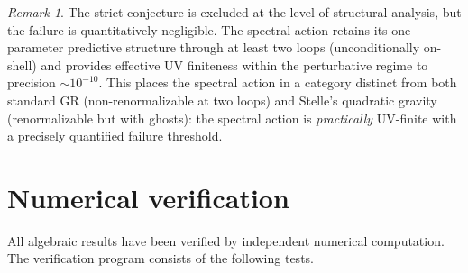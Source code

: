 \documentclass[12pt,a4paper]{article}
\theoremstyle{definition}
\theoremstyle{remark}
\newtheorem{remark}[theorem]{Remark}
\begin{document}
\begin{remark}
The strict conjecture is excluded at the level of structural analysis, but the failure is quantitatively
negligible.  The spectral action retains its one-parameter predictive
structure through at least two loops (unconditionally on-shell) and provides
effective UV finiteness within the perturbative regime to precision
$\sim 10^{-10}$.  This places the spectral action in a category distinct
from both standard GR (non-renormalizable at two loops) and Stelle's
quadratic gravity~\cite{Stelle:1976gc} (renormalizable but with ghosts):
the spectral action is \emph{practically} UV-finite with a precisely
quantified failure threshold.
\end{remark}


\section{Numerical verification}
\label{sec:numerical}

All algebraic results have been verified by independent numerical computation.
The verification program consists of the following tests.
\end{document}
